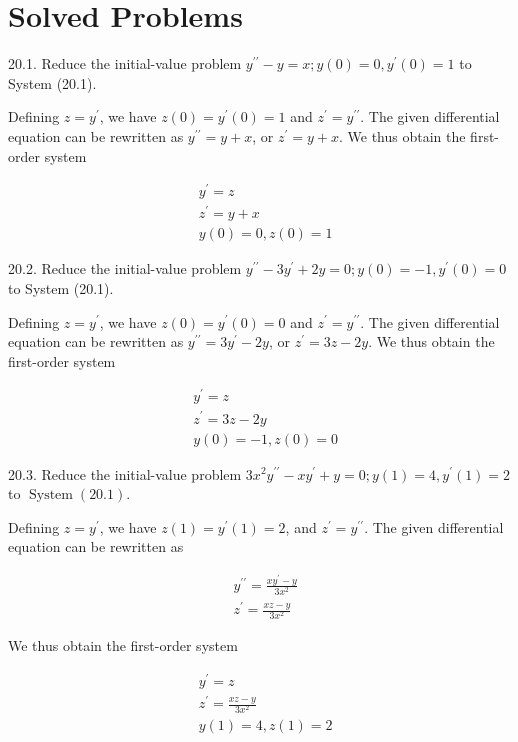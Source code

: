 \documentclass[10pt]{article}
\begin{document}
\section*{Solved Problems}
20.1. Reduce the initial-value problem $y^{\prime \prime}-y=x ; y(0)=0, y^{\prime}(0)=1$ to System (20.1).

Defining $z=y^{\prime}$, we have $z(0)=y^{\prime}(0)=1$ and $z^{\prime}=y^{\prime \prime}$. The given differential equation can be rewritten as $y^{\prime \prime}=y+x$, or $z^{\prime}=y+x$. We thus obtain the first-order system

$$
\begin{aligned}
& y^{\prime}=z \\
& z^{\prime}=y+x \\
& y(0)=0, z(0)=1
\end{aligned}
$$

20.2. Reduce the initial-value problem $y^{\prime \prime}-3 y^{\prime}+2 y=0 ; y(0)=-1, y^{\prime}(0)=0$ to System (20.1).

Defining $z=y^{\prime}$, we have $z(0)=y^{\prime}(0)=0$ and $z^{\prime}=y^{\prime \prime}$. The given differential equation can be rewritten as $y^{\prime \prime}=3 y^{\prime}-2 y$, or $z^{\prime}=3 z-2 y$. We thus obtain the first-order system

$$
\begin{aligned}
& y^{\prime}=z \\
& z^{\prime}=3 z-2 y \\
& y(0)=-1, z(0)=0
\end{aligned}
$$

20.3. Reduce the initial-value problem $3 x^{2} y^{\prime \prime}-x y^{\prime}+y=0 ; y(1)=4, y^{\prime}(1)=2$ to $\operatorname{System}(20.1)$.

Defining $z=y^{\prime}$, we have $z(1)=y^{\prime}(1)=2$, and $z^{\prime}=y^{\prime \prime}$. The given differential equation can be rewritten as

$$
\begin{aligned}
& y^{\prime \prime}=\frac{x y^{\prime}-y}{3 x^{2}} \\
& z^{\prime}=\frac{x z-y}{3 x^{2}}
\end{aligned}
$$

We thus obtain the first-order system

$$
\begin{aligned}
& y^{\prime}=z \\
& z^{\prime}=\frac{x z-y}{3 x^{2}} \\
& y(1)=4, z(1)=2
\end{aligned}
$$
\end{document}
